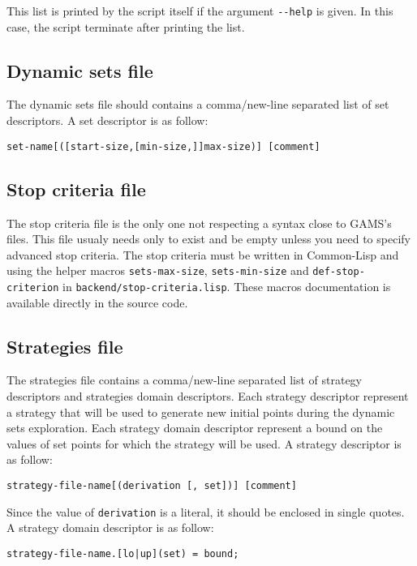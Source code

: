 This list is printed by the script itself if the argument \texttt{-{}-help} is
given. In this case, the script terminate after printing the list.

\subsection*{Dynamic sets file}

The dynamic sets file should contains a comma/new-line separated list of set descriptors.
A set descriptor is as follow:
\begin{center}
  \texttt{set-name[([start-size,[min-size,]]max-size)] [comment]}
\end{center}

\subsection*{Stop criteria file}

The stop criteria file is the only one not respecting a syntax close to GAMS's
files. This file usualy needs only to exist and be empty unless you need to
specify advanced stop criteria. The stop criteria must be written in Common-Lisp
and using the helper macros \texttt{sets-max-size}, \texttt{sets-min-size} and
\texttt{def-stop-criterion} in \texttt{backend/stop-criteria.lisp}. These macros
documentation is available directly in the source code.

\subsection*{Strategies file}

The strategies file contains a comma/new-line separated list of strategy
descriptors and strategies domain descriptors. Each strategy descriptor
represent a strategy that will be used to generate new initial points during the
dynamic sets exploration.  Each strategy domain descriptor represent a bound on
the values of set points for which the strategy will be used. A strategy
descriptor is as follow:
\begin{center}
  \texttt{strategy-file-name[(derivation [, set])] [comment]}
\end{center}
Since the value of \texttt{derivation} is a literal, it should be enclosed in
single quotes. A strategy domain descriptor is as follow:
\begin{center}
  \texttt{strategy-file-name.[lo|up](set) = bound;}
\end{center}

